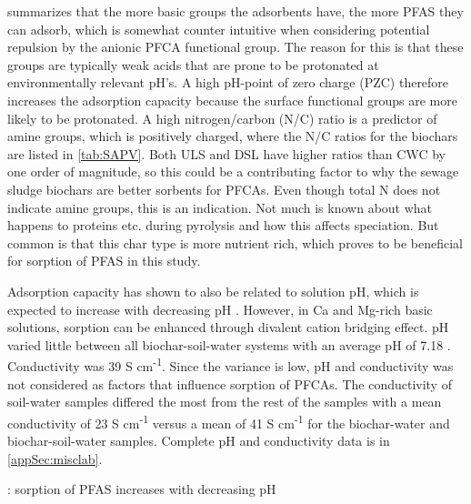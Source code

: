 \cite{du2014adsorption} summarizes that the more basic groups the adsorbents have, the more PFAS they can adsorb, which is somewhat counter intuitive when considering potential repulsion by the anionic PFCA functional group. The reason for this is that these groups are typically weak acids that are prone to be protonated at environmentally relevant pH's. A high pH-point of zero charge (PZC) therefore increases the adsorption capacity because the surface functional groups are more likely to be protonated. A high nitrogen/carbon (N/C) ratio is a predictor of amine groups, which is positively charged, where the N/C ratios for the biochars are listed in \cref{tab:SAPV}. Both ULS and DSL have higher ratios than CWC by one order of magnitude, so this could be a contributing factor to why the sewage sludge biochars are better sorbents for PFCAs. Even though total N does not indicate amine groups, this is an indication. Not much is known about what happens to proteins etc. during pyrolysis and how this affects speciation. But common is that this char type is more nutrient rich, which proves to be beneficial for sorption of PFAS in this study. 

Adsorption capacity has shown to also be related to solution pH, which is expected to increase with decreasing pH \citep{du2014adsorption}. However, in Ca and Mg-rich basic solutions, sorption can be enhanced through divalent cation bridging effect. pH varied little between all biochar-soil-water systems with an average pH of 7.18 . Conductivity was 39  \textmu S cm\textsuperscript{-1}. Since the variance is low, pH and conductivity was not considered as factors that influence sorption of PFCAs. The conductivity of soil-water samples differed the most from the rest of the samples with a mean conductivity of 23  \textmu S cm\textsuperscript{-1} versus a mean of 41  \textmu S cm\textsuperscript{-1} for the biochar-water and biochar-soil-water samples. Complete pH and conductivity data is in \cref{appSec:misclab}.

\citep{zhang2013sorption}: sorption of PFAS increases with decreasing pH

